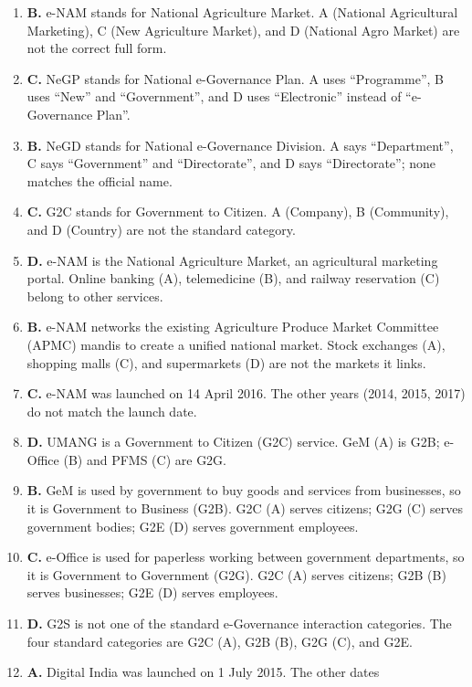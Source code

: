 \begin{enumerate}[label=\textbf{Q\arabic*.}, leftmargin=*]
\item \textbf{B.} e-NAM stands for National Agriculture Market. A (National
  Agricultural Marketing), C (New Agriculture Market), and D (National Agro
  Market) are not the correct full form.
\item \textbf{C.} NeGP stands for National e-Governance Plan. A uses
  ``Programme'', B uses ``New'' and ``Government'', and D uses
  ``Electronic'' instead of ``e-Governance Plan''.
\item \textbf{B.} NeGD stands for National e-Governance Division. A says
  ``Department'', C says ``Government'' and ``Directorate'', and D says
  ``Directorate''; none matches the official name.
\item \textbf{C.} G2C stands for Government to Citizen. A (Company), B
  (Community), and D (Country) are not the standard category.
\item \textbf{D.} e-NAM is the National Agriculture Market, an agricultural
  marketing portal. Online banking (A), telemedicine (B), and railway
  reservation (C) belong to other services.
\item \textbf{B.} e-NAM networks the existing Agriculture Produce Market
  Committee (APMC) mandis to create a unified national market. Stock
  exchanges (A), shopping malls (C), and supermarkets (D) are not the
  markets it links.
\item \textbf{C.} e-NAM was launched on 14 April 2016. The other years (2014,
  2015, 2017) do not match the launch date.
\item \textbf{D.} UMANG is a Government to Citizen (G2C) service. GeM (A) is
  G2B; e-Office (B) and PFMS (C) are G2G.
\item \textbf{B.} GeM is used by government to buy goods and services from
  businesses, so it is Government to Business (G2B). G2C (A) serves citizens;
  G2G (C) serves government bodies; G2E (D) serves government employees.
\item \textbf{C.} e-Office is used for paperless working between government
  departments, so it is Government to Government (G2G). G2C (A) serves
  citizens; G2B (B) serves businesses; G2E (D) serves employees.
\item \textbf{D.} G2S is not one of the standard e-Governance interaction
  categories. The four standard categories are G2C (A), G2B (B), G2G (C),
  and G2E.
\item \textbf{A.} Digital India was launched on 1 July 2015. The other dates

\end{enumerate}
